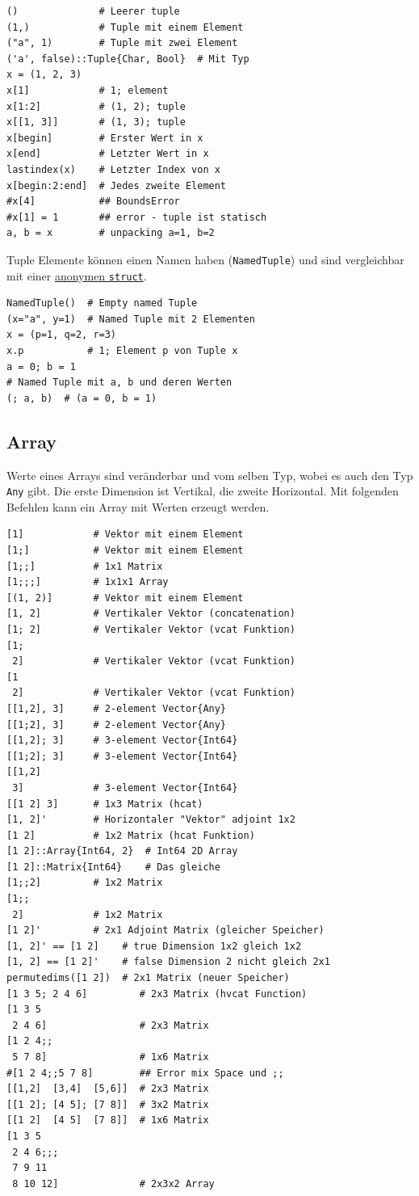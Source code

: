 \documentclass[10pt,twocolumn]{scrartcl}
\begin{document}
\begin{lstlisting}
()              # Leerer tuple
(1,)            # Tuple mit einem Element
("a", 1)        # Tuple mit zwei Element
('a', false)::Tuple{Char, Bool}  # Mit Typ
x = (1, 2, 3)
x[1]            # 1; element
x[1:2]          # (1, 2); tuple
x[[1, 3]]       # (1, 3); tuple
x[begin]        # Erster Wert in x
x[end]          # Letzter Wert in x
lastindex(x)    # Letzter Index von x
x[begin:2:end]  # Jedes zweite Element
#x[4]           ## BoundsError
#x[1] = 1       ## error - tuple ist statisch
a, b = x        # unpacking a=1, b=2
\end{lstlisting}

Tuple Elemente können einen Namen haben (\lstinline|NamedTuple|) und sind
vergleichbar mit einer \hyperref[ssec:composite]{anonymen \lstinline|struct|}.

\begin{lstlisting}
NamedTuple()  # Empty named Tuple
(x="a", y=1)  # Named Tuple mit 2 Elementen
x = (p=1, q=2, r=3)
x.p           # 1; Element p von Tuple x
a = 0; b = 1
# Named Tuple mit a, b und deren Werten
(; a, b)  # (a = 0, b = 1)
\end{lstlisting}

\subsection{Array}
\label{ssec:array}

Werte eines Arrays sind veränderbar und vom selben Typ, wobei es auch den Typ
\lstinline|Any| gibt. Die erste Dimension ist Vertikal, die zweite Horizontal.
Mit folgenden Befehlen kann ein Array mit Werten erzeugt werden.

\begin{lstlisting}
[1]            # Vektor mit einem Element
[1;]           # Vektor mit einem Element
[1;;]          # 1x1 Matrix
[1;;;]         # 1x1x1 Array
[(1, 2)]       # Vektor mit einem Element
[1, 2]         # Vertikaler Vektor (concatenation)
[1; 2]         # Vertikaler Vektor (vcat Funktion)
[1;
 2]            # Vertikaler Vektor (vcat Funktion)
[1
 2]            # Vertikaler Vektor (vcat Funktion)
[[1,2], 3]     # 2-element Vector{Any}
[[1;2], 3]     # 2-element Vector{Any}
[[1,2]; 3]     # 3-element Vector{Int64}
[[1;2]; 3]     # 3-element Vector{Int64}
[[1,2]
 3]            # 3-element Vector{Int64}
[[1 2] 3]      # 1x3 Matrix (hcat)
[1, 2]'        # Horizontaler "Vektor" adjoint 1x2
[1 2]          # 1x2 Matrix (hcat Funktion)
[1 2]::Array{Int64, 2}  # Int64 2D Array
[1 2]::Matrix{Int64}    # Das gleiche
[1;;2]         # 1x2 Matrix
[1;;
 2]            # 1x2 Matrix
[1 2]'         # 2x1 Adjoint Matrix (gleicher Speicher)
[1, 2]' == [1 2]    # true Dimension 1x2 gleich 1x2
[1, 2] == [1 2]'    # false Dimension 2 nicht gleich 2x1
permutedims([1 2])  # 2x1 Matrix (neuer Speicher)
[1 3 5; 2 4 6]         # 2x3 Matrix (hvcat Function)
[1 3 5
 2 4 6]                # 2x3 Matrix
[1 2 4;;
 5 7 8]                # 1x6 Matrix
#[1 2 4;;5 7 8]        ## Error mix Space und ;;
[[1,2]  [3,4]  [5,6]]  # 2x3 Matrix
[[1 2]; [4 5]; [7 8]]  # 3x2 Matrix
[[1 2]  [4 5]  [7 8]]  # 1x6 Matrix
[1 3 5
 2 4 6;;;
 7 9 11
 8 10 12]              # 2x3x2 Array
\end{lstlisting}
\end{document}
